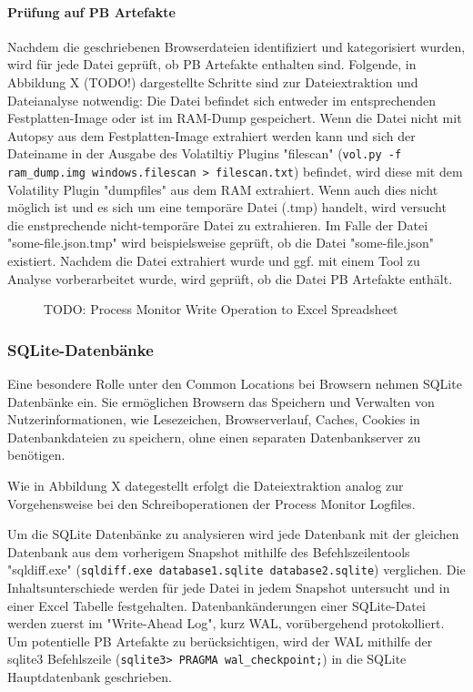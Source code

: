 \paragraph*{Prüfung auf PB Artefakte}
Nachdem die geschriebenen Browserdateien identifiziert und kategorisiert wurden, wird für jede Datei geprüft, ob PB Artefakte enthalten sind. Folgende, in Abbildung X (TODO!) dargestellte Schritte sind zur Dateiextraktion und Dateianalyse notwendig:
Die Datei befindet sich entweder im entsprechenden Festplatten-Image oder ist im RAM-Dump gespeichert. 
Wenn die Datei nicht mit Autopsy aus dem Festplatten-Image extrahiert werden kann und sich der Dateiname in der Ausgabe des Volatiltiy Plugins "filescan" (\texttt{vol.py -f ram\_dump.img windows.filescan > filescan.txt}) befindet, wird diese mit dem Volatility Plugin "dumpfiles" aus dem RAM extrahiert.
Wenn auch dies nicht möglich ist und es sich um eine temporäre Datei (.tmp) handelt, wird versucht die enstprechende nicht-temporäre Datei zu extrahieren. 
Im Falle der Datei "some-file.json.tmp" wird beispielsweise geprüft, ob die Datei "some-file.json" existiert.
Nachdem die Datei extrahiert wurde und ggf. mit einem Tool zu Analyse vorberarbeitet wurde, wird geprüft, ob die Datei PB Artefakte enthält.
\begin{figure}[h!]
	\centering
	\small
	\centerline{\resizebox{\linewidth}{!}{}}
	\caption{TODO: Process Monitor Write Operation to Excel Spreadsheet}
	\label{fig:jes}
\end{figure}

\subsubsection*{SQLite-Datenbänke}

Eine besondere Rolle unter den Common Locations bei Browsern nehmen SQLite Datenbänke ein. 
Sie ermöglichen Browsern das Speichern und Verwalten von Nutzerinformationen, wie Lesezeichen, Browserverlauf, Caches, Cookies in Datenbankdateien zu speichern, ohne einen separaten Datenbankserver zu benötigen.

Wie in Abbildung X dategestellt erfolgt die Dateiextraktion analog zur Vorgehensweise bei den Schreiboperationen der Process Monitor Logfiles.

Um die SQLite Datenbänke zu analysieren wird jede Datenbank mit der gleichen Datenbank aus dem vorherigem Snapshot mithilfe des Befehlszeilentools "sqldiff.exe" (\texttt{sqldiff.exe database1.sqlite database2.sqlite}) verglichen. Die Inhaltsunterschiede werden für jede Datei in jedem Snapshot untersucht und in einer Excel Tabelle festgehalten.
Datenbankänderungen einer SQLite-Datei werden zuerst im "Write-Ahead Log", kurz WAL, vorübergehend protokolliert. 
Um potentielle PB Artefakte zu berücksichtigen, wird der WAL mithilfe der sqlite3 Befehlszeile (\texttt{sqlite3> PRAGMA wal\_checkpoint;}) in die SQLite Hauptdatenbank geschrieben.

